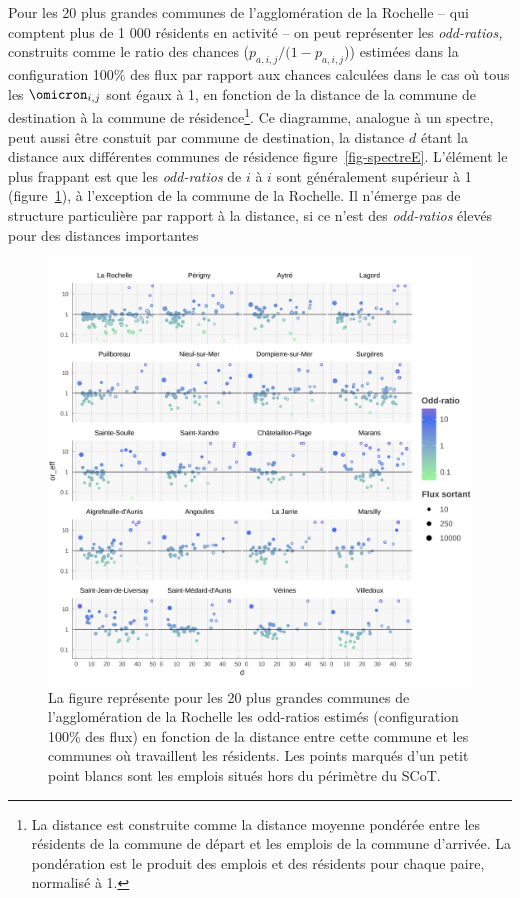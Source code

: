 \documentclass[
  10pt,
  a4paper,
  numbers=noendperiod,
  DIV=9]{scrreprt}
\begin{document}
Pour les 20 plus grandes communes de l'agglomération de la Rochelle --
qui comptent plus de 1 000 résidents en activité -- on peut représenter
les \emph{odd-ratios,} construits comme le ratio des chances
(\(p_{a,i,j}/(1-p_{a,i,j}\))) estimées dans la configuration 100\% des
flux par rapport aux chances calculées dans le cas où tous les
\(\omicron_{i,j}\) sont égaux à 1, en fonction de la distance de la
commune de destination à la commune de résidence\footnote{La distance
  est construite comme la distance moyenne pondérée entre les résidents
  de la commune de départ et les emplois de la commune d'arrivée. La
  pondération est le produit des emplois et des résidents pour chaque
  paire, normalisé à 1.}. Ce diagramme, analogue à un spectre, peut
aussi être constuit par commune de destination, la distance \(d\) étant
la distance aux différentes communes de résidence
figure~\ref{fig-spectreE}. L'élément le plus frappant est que les
\emph{odd-ratios} de \(i\) à \(i\) sont généralement supérieur à 1
(figure~\ref{fig-spectreR}), à l'exception de la commune de la Rochelle.
Il n'émerge pas de structure particulière par rapport à la distance, si
ce n'est des \emph{odd-ratios} élevés pour des distances importantes

\begin{figure}[htb]

{\centering \includegraphics[width=1\textwidth,height=\textheight]{./output/spectre effectif par COMMUNE 100.png}

}

\caption[Odd-ratio par commune de résidence fonction de la distance aux
communes d'emploi (spectre résidents)]{\label{fig-spectreR}La figure
représente pour les 20 plus grandes communes de l'agglomération de la
Rochelle les odd-ratios estimés (configuration 100\% des flux) en
fonction de la distance entre cette commune et les communes où
travaillent les résidents. Les points marqués d'un petit point blancs
sont les emplois situés hors du périmètre du SCoT.}

\end{figure}
\end{document}
